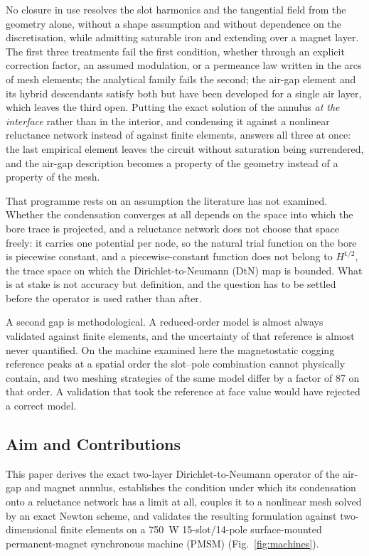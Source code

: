\documentclass[10pt,a4paper,twocolumn]{article}
\theoremstyle{plain}
\theoremstyle{remark}
\begin{document}
No closure in use resolves the slot harmonics and the tangential field
from the geometry alone, without a shape assumption and without
dependence on the discretisation, while admitting saturable iron and
extending over a magnet layer. The first three treatments fail the first
condition, whether through an explicit correction factor, an assumed
modulation, or a permeance law written in the arcs of mesh elements; the
analytical family fails the second; the air-gap element and its hybrid
descendants satisfy both but have been developed for a single air layer,
which leaves the third open. Putting the exact solution of the annulus
\emph{at the interface} rather than in the interior, and condensing it
against a nonlinear reluctance network instead of against finite
elements, answers all three at once: the last empirical element leaves
the circuit without saturation being surrendered, and the air-gap
description becomes a property of the geometry instead of a property of
the mesh.

That programme rests on an assumption the literature has not examined.
Whether the condensation converges at all depends on the space into
which the bore trace is projected, and a reluctance network does not
choose that space freely: it carries one potential per node, so the
natural trial function on the bore is piecewise constant, and a
piecewise-constant function does not belong to $H^{1/2}$, the trace
space on which the Dirichlet-to-Neumann (DtN) map is bounded. What is at stake
is not accuracy but definition, and the question has to be settled
before the operator is used rather than after.

A second gap is methodological. A reduced-order model is almost always
validated against finite elements, and the uncertainty of that reference
is almost never quantified. On the machine examined here the
magnetostatic cogging reference peaks at a spatial order the slot--pole
combination cannot physically contain, and two meshing strategies of the
same model differ by a factor of 87 on that order. A validation that
took the reference at face value would have rejected a correct model.

\subsection{Aim and Contributions}
\label{sub:aim}

This paper derives the exact two-layer Dirichlet-to-Neumann operator of
the air-gap and magnet annulus, establishes the condition under which
its condensation onto a reluctance network has a limit at all, couples
it to a nonlinear mesh solved by an exact Newton scheme, and validates
the resulting formulation against two-dimensional finite elements on a
\SI{750}{\watt} 15-slot/14-pole surface-mounted permanent-magnet
synchronous machine (PMSM) (Fig.~\ref{fig:machines}).
\end{document}
